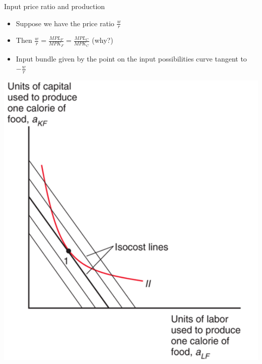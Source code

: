\documentclass[ignorenonframetext,]{beamer}
\begin{document}
\begin{frame}{Input price ratio and production}

    \begin{itemize}
        \item Suppose we have the price ratio $\frac{w}{r}$
        \item Then $\frac{w}{r} = \frac{MPL_F}{MPK_F} = \frac{MPL_C}{MPK_C}$ (why?)
        \item Input bundle given by the point on the input possibilities curve tangent to $-\frac{w}{r}$
    \end{itemize}
    \includegraphics[scale=0.15]{input_cost.png}

\end{frame}
\end{document}
